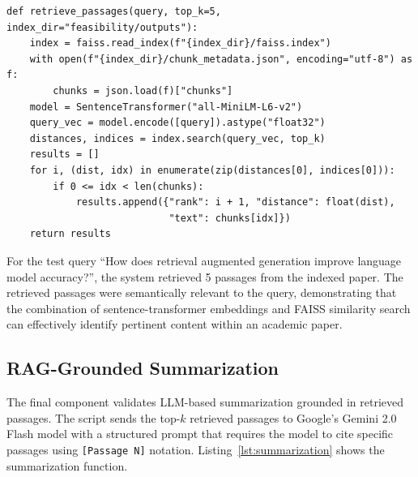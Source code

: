 \documentclass[12pt,a4paper]{article}
\begin{document}
\begin{lstlisting}[caption={FAISS-based passage retrieval},label=lst:retrieval_rag]
def retrieve_passages(query, top_k=5, index_dir="feasibility/outputs"):
    index = faiss.read_index(f"{index_dir}/faiss.index")
    with open(f"{index_dir}/chunk_metadata.json", encoding="utf-8") as f:
        chunks = json.load(f)["chunks"]
    model = SentenceTransformer("all-MiniLM-L6-v2")
    query_vec = model.encode([query]).astype("float32")
    distances, indices = index.search(query_vec, top_k)
    results = []
    for i, (dist, idx) in enumerate(zip(distances[0], indices[0])):
        if 0 <= idx < len(chunks):
            results.append({"rank": i + 1, "distance": float(dist),
                            "text": chunks[idx]})
    return results
\end{lstlisting}

For the test query ``How does retrieval augmented generation improve language model accuracy?'', the system retrieved 5 passages from the indexed paper. The retrieved passages were semantically relevant to the query, demonstrating that the combination of sentence-transformer embeddings and FAISS similarity search can effectively identify pertinent content within an academic paper.

\subsection{RAG-Grounded Summarization}

The final component validates LLM-based summarization grounded in retrieved passages. The script sends the top-$k$ retrieved passages to Google's Gemini 2.0 Flash model with a structured prompt that requires the model to cite specific passages using \texttt{[Passage N]} notation. Listing~\ref{lst:summarization} shows the summarization function.
\end{document}
